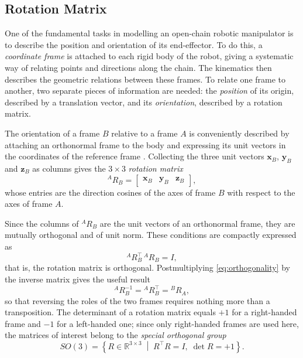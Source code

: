 \subsection{Rotation Matrix}

One of the fundamental tasks in modelling an open-chain robotic manipulator is to
describe the position and orientation of its end-effector. To do this, a
\textit{coordinate frame} is attached to each rigid body of the robot, giving a
systematic way of relating points and directions along the chain. The kinematics
then describes the geometric relations between these frames. To relate one frame
to another, two separate pieces of information are needed: the \textit{position}
of its origin, described by a translation vector, and its \textit{orientation},
described by a rotation matrix.

The orientation of a frame $B$ relative to a frame $A$ is conveniently described
by attaching an orthonormal frame to the body and expressing its unit vectors in
the coordinates of the reference frame \cite{siciliano2009robotics}. Collecting
the three unit vectors $\mathbf{x}_B$, $\mathbf{y}_B$ and $\mathbf{z}_B$ as
columns gives the $3 \times 3$ \textit{rotation matrix}
\begin{equation}
    ^A R_B = \begin{bmatrix}
        \mathbf{x}_B & \mathbf{y}_B & \mathbf{z}_B
    \end{bmatrix},
    \label{eq:rotation_matrix}
\end{equation}
whose entries are the direction cosines of the axes of frame $B$ with respect to
the axes of frame $A$.

Since the columns of $^A R_B$ are the unit vectors of an orthonormal frame, they
are mutually orthogonal and of unit norm. These conditions are compactly expressed
as
\begin{equation}
    ^A R_B^\top \, ^A R_B = I,
    \label{eq:orthogonality}
\end{equation}
that is, the rotation matrix is orthogonal. Postmultiplying \eqref{eq:orthogonality}
by the inverse matrix gives the useful result
\begin{equation}
    ^A R_B^{-1} = {}^A R_B^\top = {}^B R_A,
\end{equation}
so that reversing the roles of the two frames requires nothing more than a
transposition. The determinant of a rotation matrix equals $+1$ for a right-handed
frame and $-1$ for a left-handed one; since only right-handed frames are used here,
the matrices of interest belong to the \textit{special orthogonal group}
\begin{equation}
    SO(3) = \left\{ R \in \mathbb{R}^{3\times 3} \;\middle|\;
    R^\top R = I, \; \det R = +1 \right\}.
\end{equation}

